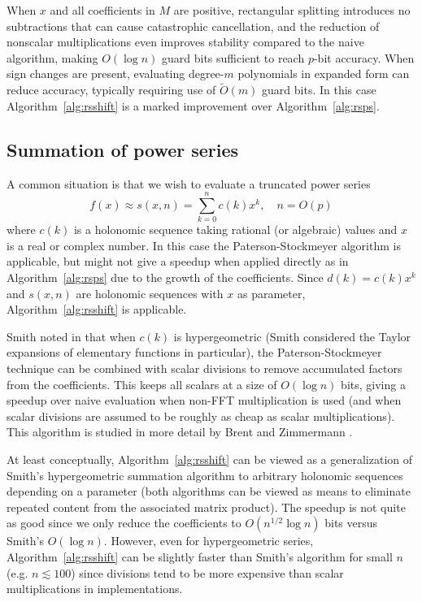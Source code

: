\documentclass{sig-alternate}
\begin{document}
When $x$ and all coefficients in $M$ are
positive, rectangular splitting introduces no subtractions that
can cause catastrophic cancellation, and the reduction
of nonscalar multiplications
even improves stability compared to the naive algorithm,
making $O(\log n)$ guard bits sufficient to reach $p$-bit accuracy.
When sign changes are present, evaluating degree-$m$
polynomials in expanded form can reduce accuracy, typically
requiring use of $\tilde O(m)$ guard bits. In this case
Algorithm~\ref{alg:rsshift} is a
marked improvement over Algorithm~\ref{alg:rsps}.

\subsection{Summation of power series}

A common situation is that we wish to evaluate
a truncated power series
\begin{equation}
f(x) \approx s(x,n) = \sum_{k=0}^n c(k) x^k, \quad n = O(p)
\label{eq:fseries}
\end{equation}
where $c(k)$ is a holonomic sequence taking rational (or algebraic)
values and $x$ is a real or complex number.
In this case the Paterson-Stockmeyer algorithm is applicable,
but might not give a speedup when applied directly
as in Algorithm~\ref{alg:rsps} due to the growth of the coefficients.
Since $d(k) = c(k) x^k$ and $s(x,n)$ are
holonomic sequences with $x$ as parameter,
Algorithm~\ref{alg:rsshift} is applicable.

Smith noted in \cite{Smith1989} that when $c(k)$ is hypergeometric
(Smith considered the Taylor expansions of elementary functions
in particular),
the Paterson-Stockmeyer technique can be combined with scalar divisions
to remove accumulated factors from the coefficients.
This keeps all scalars at a size of $O(\log n)$ bits,
giving a speedup over naive evaluation when
non-FFT multiplication is used
(and when scalar divisions are assumed to be roughly
as cheap as scalar multiplications).
This algorithm is studied in more detail by Brent and Zimmermann \cite{mca}.

At least conceptually, Algorithm~\ref{alg:rsshift} can be viewed as a
generalization of Smith's hypergeometric summation algorithm
to arbitrary holonomic sequences depending on a parameter
(both algorithms can be viewed as means to
eliminate repeated content from the associated matrix product).
The speedup is not quite as good since we only reduce
the coefficients to $O(n^{1/2} \log n)$ bits versus Smith's $O(\log n)$.
However, even for hypergeometric series, Algorithm~\ref{alg:rsshift}
can be slightly faster than Smith's algorithm for small $n$
(e.g. $n \lesssim 100$) since divisions tend to be more expensive than
scalar multiplications in implementations.
\end{document}
